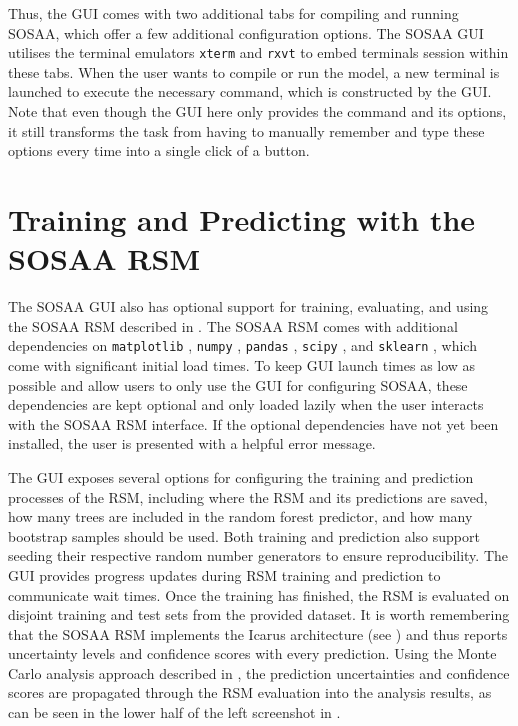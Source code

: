 Thus, the GUI comes with two additional tabs for compiling and running SOSAA, which offer a few additional configuration options. The SOSAA GUI utilises the terminal emulators \texttt{xterm} and \texttt{rxvt} to embed terminals session within these tabs. When the user wants to compile or run the model, a new terminal is launched to execute the necessary command, which is constructed by the GUI. Note that even though the GUI here only provides the command and its options, it still transforms the task from having to manually remember and type these options every time into a single click of a button.

\section{Training and Predicting with the SOSAA RSM} \label{txt:sosaa-gui-icarus}

The SOSAA GUI also has optional support for training, evaluating, and using the SOSAA RSM described in . The SOSAA RSM comes with additional dependencies on \texttt{matplotlib} \cite{matplotlib-2007}, \texttt{numpy} \cite{numpy-2020}, \texttt{pandas} \cite{pandas-2010}, \texttt{scipy} \cite{scipy-2020}, and \texttt{sklearn} \cite{scikit-learn-2011, sklearn-api-2013}, which come with significant initial load times. To keep GUI launch times as low as possible and allow users to only use the GUI for configuring SOSAA, these dependencies are kept optional and only loaded lazily when the user interacts with the SOSAA RSM interface. If the optional dependencies have not yet been installed, the user is presented with a helpful error message.

The GUI exposes several options for configuring the training and prediction processes of the RSM, including where the RSM and its predictions are saved, how many trees are included in the random forest predictor, and how many bootstrap samples should be used. Both training and prediction also support seeding their respective random number generators to ensure reproducibility. The GUI provides progress updates during RSM training and prediction to communicate wait times. Once the training has finished, the RSM is evaluated on disjoint training and test sets from the provided dataset. It is worth remembering that the SOSAA RSM implements the Icarus architecture (see ) and thus reports uncertainty levels and confidence scores with every prediction. Using the Monte Carlo analysis approach described in , the prediction uncertainties and confidence scores are propagated through the RSM evaluation into the analysis results, as can be seen in the lower half of the left screenshot in .

